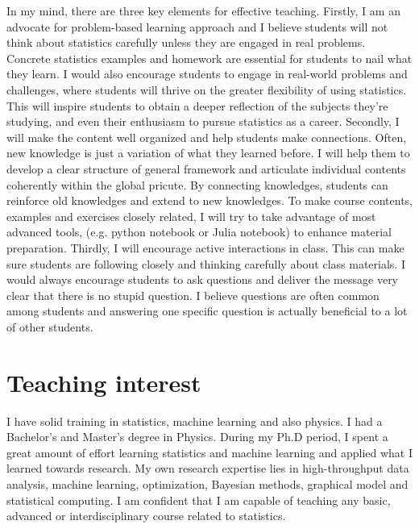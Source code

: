 \documentclass[12pt]{amsart} \usepackage{amssymb}
\begin{document}
In my mind, there are three key elements for effective teaching.
Firstly, I am an advocate for problem-based learning approach and 
I believe students will not think about statistics carefully unless they are engaged in real problems.
Concrete statistics examples and homework are essential for students to nail what they learn.
I would also encourage students to engage in real-world problems and challenges,
where students will thrive on the greater flexibility of using statistics.
This will inspire students to obtain a deeper reflection of the subjects they're studying,
and even their enthusiasm to pursue statistics as a career. 
Secondly, I will make the content well organized and help students make connections.
Often, new knowledge is just a variation of what they learned before.
I will help them to develop a clear structure of general framework and 
articulate  individual contents coherently within the global pricute.
By connecting knowledges,
students can reinforce old knowledges and extend to new knowledges.
To make course contents, examples and exercises closely related,
I will try to take advantage of most advanced tools, (e.g. python notebook or Julia notebook) to enhance material preparation.
Thirdly, I will encourage active interactions in class.
This can make sure students are following closely and thinking carefully about class materials.
I would always encourage students to ask questions and deliver the message very clear that there is no stupid question. 
I believe questions are often common among students and
answering one specific question is actually beneficial to a lot of other students.
\\

\section{Teaching interest}
I have solid training in statistics, machine learning and also physics.
I had a Bachelor's and Master's degree in Physics.
During my Ph.D period,
I spent a great amount of effort learning statistics and machine learning and applied what I learned towards research.
My own research expertise lies in high-throughput data analysis, machine learning, optimization, Bayesian methods, graphical model and statistical computing.
I am confident that I am capable of teaching any basic, advanced or interdisciplinary course related to statistics.
\end{document}
